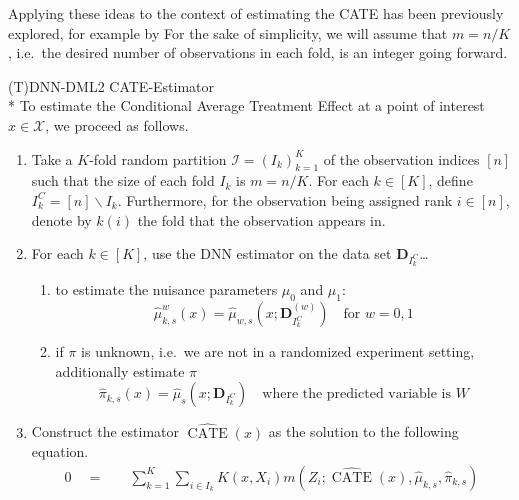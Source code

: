Applying these ideas to the context of estimating the CATE has been previously explored, for example by \citet{semenova_debiased_2021}
For the sake of simplicity, we will assume that $m = n/K$, i.e.\ the desired number of observations in each fold, is an integer going forward.
\begin{boxD}
	\begin{dfn}{(T)DNN-DML2 CATE-Estimator}\label{def:CATE_DNN_DML}\mbox{}\\*
		To estimate the Conditional Average Treatment Effect at a point of interest $x \in \mathcal{X}$, we proceed as follows.
		\begin{enumerate}
			\item Take a $K$-fold random partition $\mathcal{I} = \left(I_k\right)_{k = 1}^{K}$
			      of the observation indices $[n]$ such that the size of each fold $I_k$ is $m =
				      n/K$. For each $k \in [K]$, define $I_{k}^{C} = [n] \backslash I_k$.
			      Furthermore, for the observation being assigned rank $i \in [n]$, denote by
			      $k(i)$ the fold that the observation appears in.
			\item For each $k \in [K]$, use the DNN estimator on the data set
			      $\mathbf{D}_{I_k^C}$\dots
			      \begin{enumerate}
				      \item to estimate the nuisance parameters $\mu_0$ and $\mu_1$:
				            \begin{equation}
					            \hat{\mu}_{k,s}^{w}\left(x\right) = \hat{\mu}_{w,s}\left(x; \mathbf{D}_{I_k^{C}}^{(w)}\right) \quad \text{for } w=0,1
				            \end{equation}
				      \item if $\pi$ is unknown, i.e.\ we are not in a randomized experiment setting,
				            additionally estimate $\pi$
				            \begin{equation}
					            \hat{\pi}_{k,s}\left(x\right) = \hat{\mu}_{s}\left(x; \mathbf{D}_{I_k^{C}}\right) \quad \text{where the predicted variable is $W$}
				            \end{equation}
			      \end{enumerate}
			\item Construct the estimator $\widehat{\operatorname{CATE}}\left(x\right)$
			      as the solution to the following equation.
			      \begin{equation}
				      \begin{aligned}
					      0 \quad = \quad & \sum_{k = 1}^{K} \sum_{i \in I_k} K(x, X_{i}) m\left(Z_{i}; \widehat{\operatorname{CATE}}\left(x\right), \hat{\mu}_{k,s}, \hat{\pi}_{k,s}\right)                                                                \\

\end{aligned}
\end{equation}
\end{enumerate}
\end{dfn}
\end{boxD}
